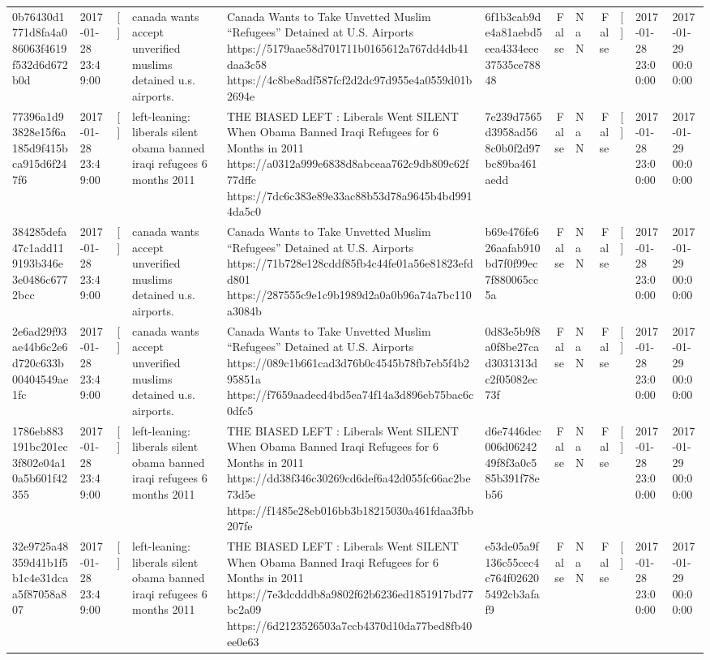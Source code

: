 \begin{tabular}{llllllrlrlll}
0b76430d1771d8fa4a086063f4619f532d6d672b0d & 2017-01-28 23:49:00 & [] & canada wants accept unverified muslims detained u.s. airports. & Canada Wants to Take Unvetted Muslim “Refugees” Detained at U.S. Airports https://5179aae58d701711b0165612a767dd4db41daa3c58 https://4c8be8adf587fcf2d2dc97d955e4a0559d01b2694e & 6f1b3cab9de4a81aebd5eea4334eee37535ce78848 & False & NaN & False & [] & 2017-01-28 23:00:00 & 2017-01-29 00:00:00 \\
77396a1d93828e15f6a185d9f415bca915d6f247f6 & 2017-01-28 23:49:00 & [] & left-leaning: liberals silent obama banned iraqi refugees 6 months 2011 & THE BIASED LEFT : Liberals Went SILENT When Obama Banned Iraqi Refugees for 6 Months in 2011 https://a0312a999e6838d8abceaa762c9db809c62f77dffc https://7dc6c383e89e33ac88b53d78a9645b4bd9914da5c0 & 7e239d7565d3958ad568c0b0f2d97bc89ba461aedd & False & NaN & False & [] & 2017-01-28 23:00:00 & 2017-01-29 00:00:00 \\
384285defa47c1add119193b346e3e0486c6772bcc & 2017-01-28 23:49:00 & [] & canada wants accept unverified muslims detained u.s. airports. & Canada Wants to Take Unvetted Muslim “Refugees” Detained at U.S. Airports https://71b728e128cddf85fb4c44fe01a56e81823efdd801 https://287555c9e1c9b1989d2a0a0b96a74a7bc110a3084b & b69e476fe626aafab910bd7f0f99ec7f880065cc5a & False & NaN & False & [] & 2017-01-28 23:00:00 & 2017-01-29 00:00:00 \\
2e6ad29f93ae44b6c2e6d720c633b00404549ae1fc & 2017-01-28 23:49:00 & [] & canada wants accept unverified muslims detained u.s. airports. & Canada Wants to Take Unvetted Muslim “Refugees” Detained at U.S. Airports https://089c1b661cad3d76b0c4545b78fb7eb5f4b295851a https://f7659aadecd4bd5ea74f14a3d896eb75bac6c0dfc5 & 0d83e5b9f8a0f8be27cad3031313dc2f05082ec73f & False & NaN & False & [] & 2017-01-28 23:00:00 & 2017-01-29 00:00:00 \\
1786eb883191bc201ec3f802e04a10a5b601f42355 & 2017-01-28 23:49:00 & [] & left-leaning: liberals silent obama banned iraqi refugees 6 months 2011 & THE BIASED LEFT : Liberals Went SILENT When Obama Banned Iraqi Refugees for 6 Months in 2011 https://dd38f346c30269cd6def6a42d055fc66ac2be73d5e https://f1485e28eb016bb3b18215030a461fdaa3fbb207fe & d6e7446dec006d0624249f8f3a0c585b391f78eb56 & False & NaN & False & [] & 2017-01-28 23:00:00 & 2017-01-29 00:00:00 \\
32e9725a48359d41b1f5b1c4e31dcaa5f87058a807 & 2017-01-28 23:49:00 & [] & left-leaning: liberals silent obama banned iraqi refugees 6 months 2011 & THE BIASED LEFT : Liberals Went SILENT When Obama Banned Iraqi Refugees for 6 Months in 2011 https://7e3dcdddb8a9802f62b6236ed1851917bd77bc2a09 https://6d2123526503a7ccb4370d10da77bed8fb40ee0e63 & e53de05a9f136c55cec4c764f026205492cb3afaf9 & False & NaN & False & [] & 2017-01-28 23:00:00 & 2017-01-29 00:00:00 \\

\end{tabular}
